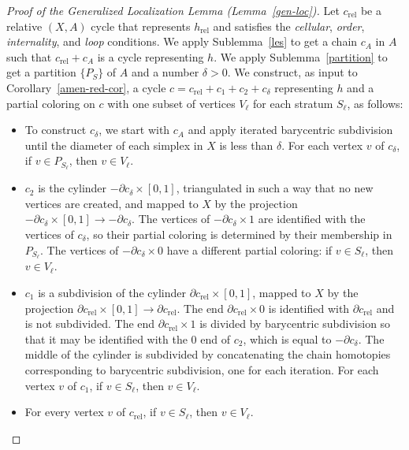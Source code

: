 \documentclass[psamsfonts]{amsart}
\theoremstyle{remark}
\newcommand{\del}{\partial}
\DeclareMathOperator{\rel}{rel}
\begin{document}
\begin{proof}[Proof of the Generalized Localization Lemma (Lemma~\ref{gen-loc})]
Let $c_{\rel}$ be a relative $(X, A)$ cycle that represents $h_{\rel}$ and satisfies the \emph{cellular}, \emph{order}, \emph{internality}, and \emph{loop} conditions.  We apply Sublemma~\ref{les} to get a chain $c_A$ in $A$ such that $c_{\rel} + c_A$ is a cycle representing $h$.  We apply Sublemma~\ref{partition} to get a partition $\{P_S\}$ of $A$ and a number $\delta > 0$.  We construct, as input to Corollary~\ref{amen-red-cor}, a cycle $c = c_{\rel} + c_1 + c_2 + c_{\delta}$ representing $h$ and a partial coloring on $c$ with one subset of vertices $V_\ell$ for each stratum $S_\ell$, as follows:
\begin{itemize}
\item To construct $c_\delta$, we start with $c_A$ and apply iterated barycentric subdivision until the diameter of each simplex in $X$ is less than $\delta$.  For each vertex $v$ of $c_\delta$, if $v \in P_{S_\ell}$, then $v \in V_\ell$.
\item $c_2$ is the cylinder $-\del c_\delta \times [0, 1]$, triangulated in such a way that no new vertices are created, and mapped to $X$ by the projection $-\del c_\delta \times [0, 1] \rightarrow -\del c_\delta$.  The vertices of $-\del c_\delta \times 1$ are identified with the vertices of $c_\delta$, so their partial coloring is determined by their membership in $P_{S_\ell}$.  The vertices of $-\del c_\delta \times 0$ have a different partial coloring: if $v \in S_\ell$, then $v \in V_\ell$.
\item $c_1$ is a subdivision of the cylinder $\del c_{\rel} \times [0, 1]$, mapped to $X$ by the projection $\del c_{\rel} \times [0, 1] \rightarrow \del c_{\rel}$.  The end $\del c_{\rel} \times 0$ is identified with $\del c_{\rel}$ and is not subdivided.  The end $\del c_{\rel} \times 1$ is divided by barycentric subdivision so that it may be identified with the $0$ end of $c_2$, which is equal to $-\del c_\delta$.  The middle of the cylinder is subdivided by concatenating the chain homotopies corresponding to barycentric subdivision, one for each iteration.  For each vertex $v$ of $c_1$, if $v \in S_\ell$, then $v \in V_\ell$.
\item For every vertex $v$ of $c_{\rel}$, if $v \in S_\ell$, then $v \in V_\ell$.
\end{itemize}


\end{proof}
\end{document}
